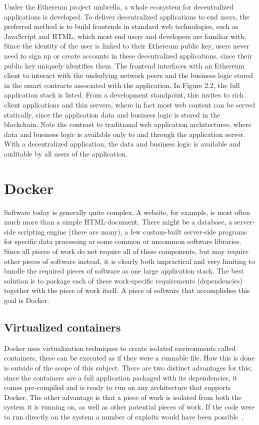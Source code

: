 Under the Ethereum project umbrella, a whole ecosystem for decentralized applications is developed. To deliver decentralized applications to end users, the preferred method is to build frontends in standard web technologies, such as JavaScript and HTML, which most end users and developers are familiar with. Since the identity of the user is linked to their Ethereum public key, users never need to sign up or create accounts in these decentralized applications, since their public key uniquely identifies them. The frontend interfaces with an Ethereum client to interact with the underlying network peers and the business logic stored in the smart contracts associated with the application. In Figure 2.2, the full application stack is listed.
From a development standpoint, this invites to rich client applications and thin servers, where in fact most web content can be served statically, since the application data and business logic is stored in the blockchain. Note the contrast to traditional web application architectures, where data and business logic is available only to and through the application server. With a decentralized application, the data and business logic is available and auditable by all users of the application.

\section{Docker}
Software today is generally quite complex. A website, for example, is most often much more than a simple HTML-document. There might be a database, a server-side scripting engine (there are many), a few custom-built server-side programs for specific data processing or some common or uncommon software libraries. Since all pieces of work do not require all of these components, but may require other pieces of software instead, it is clearly both impractical and very limiting to bundle the required pieces of software as one large application stack. The best solution is to package each of these work-specific requirements (dependencies) together with the piece of work itself. A piece of software that accomplishes this goal is Docker.

\subsection{Virtualized containers}
Docker uses virtualization techniques to create isolated environments called containers, these can be executed as if they were a runnable file. How this is done is outside of the scope of this subject.
There are two distinct advantages for this; since the containers are a full application packaged with its dependencies, it comes pre-compiled and is ready to run on any architecture that supports Docker. 
The other advantage is that a piece of work is isolated from both the system it is running on, as well as other potential pieces of work. If the code were to run directly on the system a number of exploits would have been possible~\cite{korpela:2012}.


